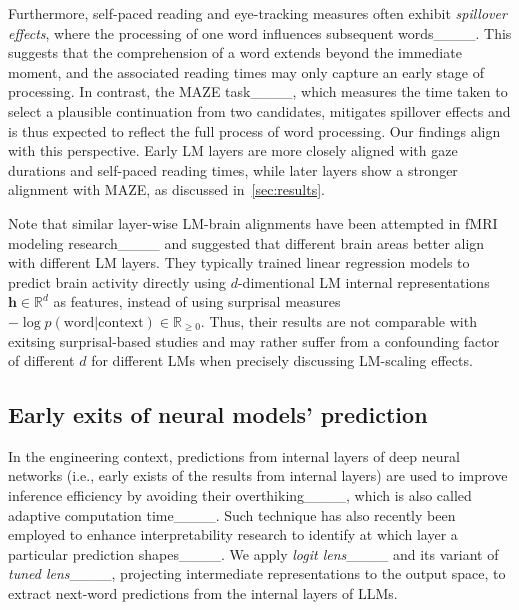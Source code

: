 Furthermore, self-paced reading and eye-tracking measures often exhibit \textit{spillover effects}, where the processing of one word influences subsequent words____. This suggests that the comprehension of a word extends beyond the immediate moment, and the associated reading times may only capture an early stage of processing.
In contrast, the MAZE task____, which measures the time taken to select a plausible continuation from two candidates, mitigates spillover effects and is thus expected to reflect the full process of word processing. 
Our findings align with this perspective. Early LM layers are more closely aligned with gaze durations and self-paced reading times, while later layers show a stronger alignment with MAZE, as discussed in~\cref{sec:results}.

Note that similar layer-wise LM-brain alignments have been attempted in fMRI modeling research____ and suggested that different brain areas better align with different LM layers.
They typically trained linear regression models to predict brain activity directly using $d$-dimentional LM internal representations $\bm h \in \mathbb{R}^d$ as features, instead of using surprisal measures $-\log p(\mathrm{word}|\mathrm{context})\in \mathbb{R}_{\ge 0}$.
Thus, their results are not comparable with exitsing surprisal-based studies and may rather suffer from a confounding factor of different $d$ for different LMs when precisely discussing LM-scaling effects. 

\subsection{Early exits of neural models' prediction}
\label{subsec:adaptive}
In the engineering context, predictions from internal layers of deep neural networks (i.e., early exists of the results from internal layers) are used to improve inference efficiency by avoiding their overthiking____, which is also called adaptive computation time____. Such technique has also recently been employed to enhance interpretability research to identify at which layer a particular prediction shapes____. 
We apply \textit{logit lens}____ and its variant of \textit{tuned lens}____, projecting intermediate representations to the output space, to extract next-word predictions from the internal layers of LLMs.